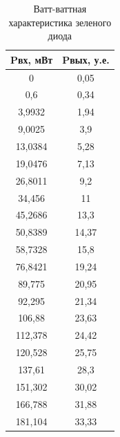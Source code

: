 \documentclass[a4paper,12pt]{article}
\begin{document}
\newpage

\begin{table}[]
	\caption{Ватт-ваттная характеристика зеленого диода}
	\begin{tabular}{|c|c|}
	\hline
	Pвх, мВт & Pвых, у.е. \\ \hline
	0        & 0,05       \\ \hline
	0,6      & 0,34       \\ \hline
	3,9932   & 1,94       \\ \hline
	9,0025   & 3,9        \\ \hline
	13,0384  & 5,28       \\ \hline
	19,0476  & 7,13       \\ \hline
	26,8011  & 9,2        \\ \hline
	34,456   & 11         \\ \hline
	45,2686  & 13,3       \\ \hline
	50,8389  & 14,37      \\ \hline
	58,7328  & 15,8       \\ \hline
	76,8421  & 19,24      \\ \hline
	89,775   & 20,95      \\ \hline
	92,295   & 21,34      \\ \hline
	106,88   & 23,63      \\ \hline
	112,378  & 24,42      \\ \hline
	120,528  & 25,75      \\ \hline
	137,61   & 28,3       \\ \hline
	151,302  & 30,02      \\ \hline
	166,788  & 31,88      \\ \hline
	181,104  & 33,33      \\ \hline
	\end{tabular}
	\end{table}

\newpage
\end{document}
